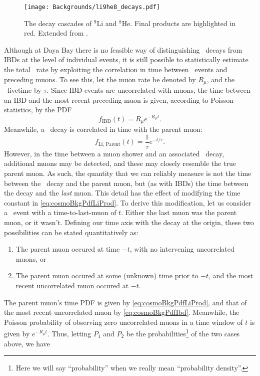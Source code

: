 \documentclass[../thesis.tex]{subfiles}
\begin{document}
\begin{figure}[h]
  \texttt{[image: Backgrounds/li9he8\_decays.pdf]}
  \caption{The decay cascades of $^9$Li and $^8$He. Final products are highlighted in red. Extended from \cite{pedroLi9Spec2}.}
  \label{fig:li9he8_decays}
\end{figure}

Although at Daya Bay there is no feasible way of distinguishing \linine\ decays from IBDs at the level of individual events, it is still possible to statistically estimate the total \linine\ rate by exploiting the correlation in time between \linine\ events and preceding muons. To see this, let the muon rate be denoted by $R_\mu$, and the \linine\ livetime by $\tau$. Since IBD events are uncorrelated with muons, the time between an IBD and the most recent preceding muon is given, according to Poisson statistics, by the PDF
\begin{equation}
  \label{eq:cosmoBkgPdfIbd}
  f_{\mathrm{IBD}}(t) = R_\mu e^{-R_\mu t}.
\end{equation}
Meanwhile, a \linine\ decay is correlated in time with the parent muon:
\begin{equation}
  \label{eq:cosmoBkgPdfLiProd}
  f_{\mathrm{Li,\,Parent}}(t) = \frac{1}{\tau} e^{-t/\tau}.
\end{equation}
However, in the time between a muon shower and an associated \linine\ decay, additional muons may be detected, and these may closely resemble the true parent muon. As such, the quantity that we can reliably measure is not the time between the \linine\ decay and the parent muon, but (as with IBDs) the time between the decay and the \emph{last} muon. This detail has the effect of modifying the time constant in \autoref{eq:cosmoBkgPdfLiProd}. To derive this modification, let us consider a \linine\ event with a time-to-last-muon of $t$. Either the last muon was the parent muon, or it wasn't. Defining our time axis with the decay at the origin, these two possibilities can be stated quantitatively as:
\begin{enumerate}
\item The parent muon occured at time $-t$, with no intervening uncorrelated muons, or
\item The parent muon occured at some (unknown) time prior to $-t$, and the most recent uncorrelated muon occured at $-t$.
\end{enumerate}
The parent muon's time PDF is given by \autoref{eq:cosmoBkgPdfLiProd}, and that of the most recent uncorrelated muon by \autoref{eq:cosmoBkgPdfIbd}. Meanwhile, the Poisson probability of observing zero uncorrelated muons in a time window of $t$ is given by $e^{-R_\mu t}$. Thus, letting $P_1$ and $P_2$ be the probabilities\footnote{Here we will say ``probability'' when we really mean ``probability density''.} of the two cases above, we have
\end{document}
